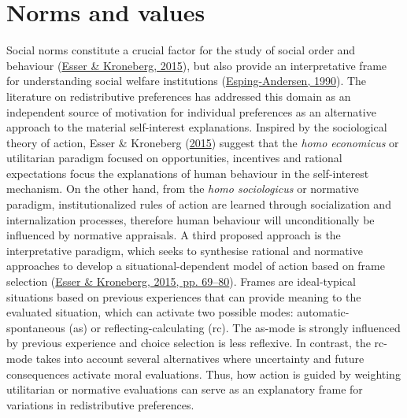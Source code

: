 \documentclass[
  12pt,
]{book}
\begin{document}
\hypertarget{norms-and-values}{%
\section{Norms and values}\label{norms-and-values}}

Social norms constitute a crucial factor for the study of social order and behaviour (\protect\hyperlink{ref-esser_integrative_2015}{Esser \& Kroneberg, 2015}), but also provide an interpretative frame for understanding social welfare institutions (\protect\hyperlink{ref-esping-andersen_three_1990}{Esping-Andersen, 1990}). The literature on redistributive preferences has addressed this domain as an independent source of motivation for individual preferences as an alternative approach to the material self-interest explanations. Inspired by the sociological theory of action, Esser \& Kroneberg (\protect\hyperlink{ref-esser_integrative_2015}{2015}) suggest that the \emph{homo economicus} or utilitarian paradigm focused on opportunities, incentives and rational expectations focus the explanations of human behaviour in the self-interest mechanism. On the other hand, from the \emph{homo sociologicus} or normative paradigm, institutionalized rules of action are learned through socialization and internalization processes, therefore human behaviour will unconditionally be influenced by normative appraisals. A third proposed approach is the interpretative paradigm, which seeks to synthesise rational and normative approaches to develop a situational-dependent model of action based on frame selection (\protect\hyperlink{ref-esser_integrative_2015}{Esser \& Kroneberg, 2015, pp. 69--80}). Frames are ideal-typical situations based on previous experiences that can provide meaning to the evaluated situation, which can activate two possible modes: automatic-spontaneous (as) or reflecting-calculating (rc). The as-mode is strongly influenced by previous experience and choice selection is less reflexive. In contrast, the rc-mode takes into account several alternatives where uncertainty and future consequences activate moral evaluations. Thus, how action is guided by weighting utilitarian or normative evaluations can serve as an explanatory frame for variations in redistributive preferences.
\end{document}
